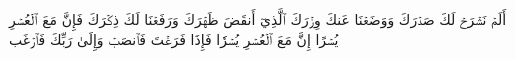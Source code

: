 أَلَمۡ نَشۡرَحۡ لَكَ صَدۡرَكَ
وَوَضَعۡنَا عَنكَ وِزۡرَكَ
ٱلَّذِيٓ أَنقَضَ ظَهۡرَكَ
وَرَفَعۡنَا لَكَ ذِكۡرَكَ
فَإِنَّ مَعَ ٱلۡعُسۡرِ يُسۡرًا
إِنَّ مَعَ ٱلۡعُسۡرِ يُسۡرٗا
فَإِذَا فَرَغۡتَ فَٱنصَبۡ
وَإِلَىٰ رَبِّكَ فَٱرۡغَب
